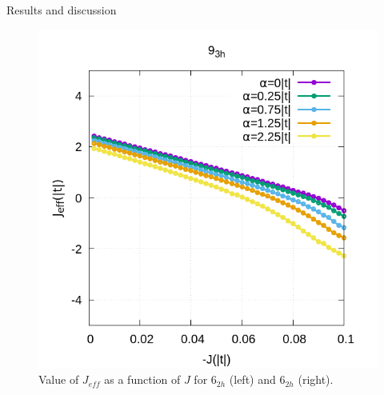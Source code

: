 \documentclass[12pt,twoside]{report}
\begin{document}
\begin{chapter}{Results and discussion}
\begin{figure}[h!]
\begin{minipage}{0.4\textwidth}
			\includegraphics[scale=0.4]{Jeff_vs_J_ar3.png}
		\end{minipage}
		\caption{\label{fig_arj} Value of $J_{eff}$ as a function of $J$ for 6$_{2h}$ (left) and 6$_{2h}$ (right). }
	\end{figure}
	

\end{chapter}
\end{document}
